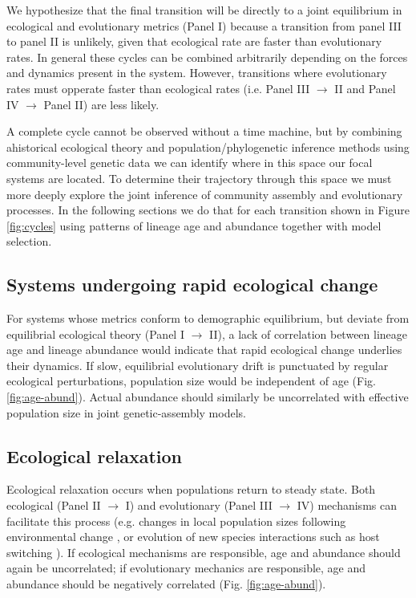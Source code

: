 \documentclass[12pt]{article}
\begin{document}
We hypothesize that the final transition will be directly to a joint
equilibrium in ecological and evolutionary metrics (Panel I) because a
transition from panel III to panel II is unlikely, given that
ecological rate are faster than evolutionary rates. In general these
cycles can be combined arbitrarily depending on the forces and
dynamics present in the system.  However, transitions where
evolutionary rates must opperate faster than ecological rates
(i.e. Panel III $\rightarrow$ II and Panel IV $\rightarrow$
Panel II) are less likely.

A complete cycle cannot be observed without a time machine, but by
combining ahistorical ecological theory and population/phylogenetic
inference methods using community-level genetic data we can identify
where in this space our focal systems are located. To determine their
trajectory through this space we must more deeply explore the joint
inference of community assembly and evolutionary processes. In the
following sections we do that for each transition shown in Figure
\ref{fig:cycles} using patterns of lineage age and abundance together
with model selection.

\subsection{Systems undergoing rapid ecological change}

For systems whose metrics conform to demographic equilibrium, but
deviate from equilibrial ecological theory (Panel I $\rightarrow$ II),
a lack of correlation between lineage age and lineage abundance would
indicate that rapid ecological change underlies their dynamics. If
slow, equilibrial evolutionary drift is punctuated by regular
ecological perturbations, population size would be independent of age
(Fig. \ref{fig:age-abund}). Actual abundance should similarly be
uncorrelated with effective population size in joint genetic-assembly
models.

\subsection{Ecological relaxation}

Ecological relaxation occurs when populations return to steady
state. Both ecological (Panel II $\rightarrow$ I) and evolutionary
(Panel III $\rightarrow$ IV) mechanisms can facilitate this process
(e.g. changes in local population sizes following environmental change
\citep{blonder2015}, or evolution of new species interactions such as
host switching \citep{rominger2015}). If ecological mechanisms are
responsible, age and abundance should again be uncorrelated; if
evolutionary mechanics are responsible, age and abundance should be
negatively correlated (Fig. \ref{fig:age-abund}).
\end{document}

